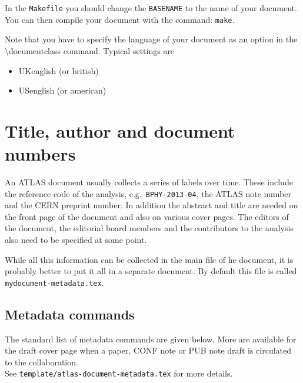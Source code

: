 \documentclass[UKenglish]{style/atlasdoc}
\newcommand{\Macro}[1]{\textbackslash #1\xspace}
\begin{document}
In the \texttt{Makefile} you should change the \texttt{BASENAME} to the name of your document.
You can then compile your document with the command: \texttt{make}.

Note that you have to specify the language of your document as an option in the
\Macro{documentclass} command. Typical settings are
\begin{itemize}
\item UKenglish (or british)
\item USenglish (or american)
\end{itemize}


\section{Title, author and document numbers}
\label{sec:metadata}

An ATLAS document usually collects a series of labels over time.
These include the reference code of the analysis, e.g.\ \texttt{BPHY-2013-04}, 
the ATLAS note number and the CERN preprint number.
In addition the abstract and title are needed on the front page of the document and also on various cover pages.
The editors of the document, the editorial board members and the contributors to the analysis
also need to be specified at some point.

While all this information can be collected in the main file of he document, 
it is probably better to put it all in a separate document.
By default this file is called \texttt{mydocument-metadata.tex}.

\subsection{Metadata commands}

The standard list of metadata commands are given below.
More are available for the draft cover page when a paper, CONF note or PUB note draft
is circulated to the collaboration.\\ 
See \texttt{template/atlas-document-metadata.tex} for more details.
\end{document}
